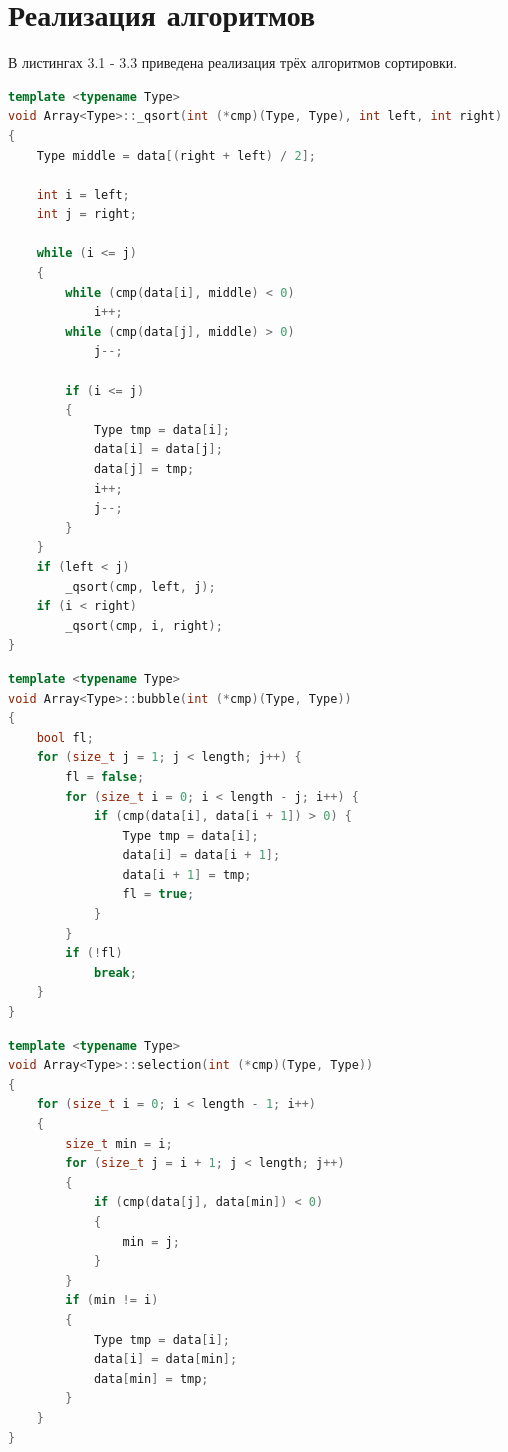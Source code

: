 \documentclass{report}
\begin{document}
\section{Реализация алгоритмов}

В листингах 3.1 - 3.3 приведена реализация трёх алгоритмов сортировки.

\begin{lstlisting}[label=some-code,caption=Функция быстрой сортировки,language=C++]
template <typename Type>
void Array<Type>::_qsort(int (*cmp)(Type, Type), int left, int right)
{
    Type middle = data[(right + left) / 2];

    int i = left;
    int j = right;

    while (i <= j)
    {
        while (cmp(data[i], middle) < 0)
            i++;
        while (cmp(data[j], middle) > 0)
            j--;

        if (i <= j)
        {
            Type tmp = data[i];
            data[i] = data[j];
            data[j] = tmp;
            i++;
            j--;
        }
    }
    if (left < j)
        _qsort(cmp, left, j);
    if (i < right)
        _qsort(cmp, i, right);
}
\end{lstlisting}

\begin{lstlisting}[label=some-code,caption=Функция сортировки массива пузырьком, language=C++]
template <typename Type>
void Array<Type>::bubble(int (*cmp)(Type, Type))
{
    bool fl;
    for (size_t j = 1; j < length; j++) {
        fl = false;
        for (size_t i = 0; i < length - j; i++) {
            if (cmp(data[i], data[i + 1]) > 0) {
                Type tmp = data[i];
                data[i] = data[i + 1];
                data[i + 1] = tmp;
                fl = true;
            }
        }
        if (!fl)
            break;
    }
}
\end{lstlisting}

\begin{lstlisting}[label=some-code,caption=Функция сортировки массива выбором,language=C++]
template <typename Type>
void Array<Type>::selection(int (*cmp)(Type, Type))
{
    for (size_t i = 0; i < length - 1; i++)
    {
        size_t min = i;
        for (size_t j = i + 1; j < length; j++)
        {
            if (cmp(data[j], data[min]) < 0)
            {
                min = j;
            }
        }
        if (min != i)
        {
            Type tmp = data[i];
            data[i] = data[min];
            data[min] = tmp;
        }
    }
}
\end{lstlisting}
\end{document}
